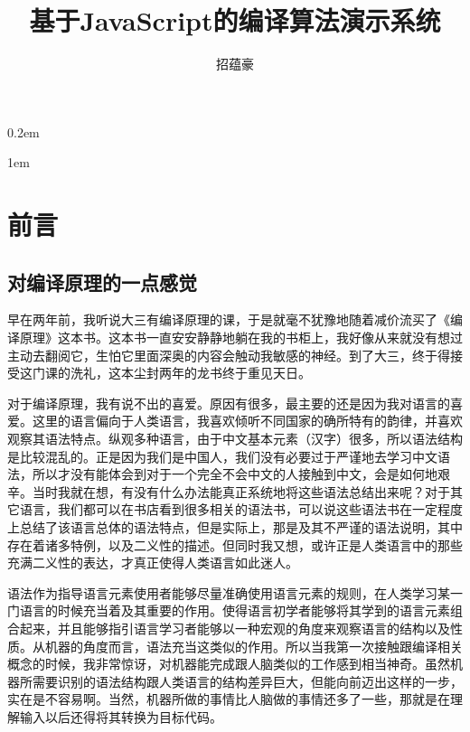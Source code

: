 \documentclass[12pt,leqno]{book}
\begin{document}
\begin{CJK}{UTF8}{gbsn}

\title{\bf{基于JavaScript的编译算法演示系统}}
\author{招蕴豪}
\maketitle
\newpage

\parskip 0.2em
\renewcommand{\contentsname}{目录}
\tableofcontents

\parskip 1em
\chapter*{前言}
\pagestyle{plain}

\section*{对编译原理的一点感觉}
早在两年前，我听说大三有编译原理的课，于是就毫不犹豫地随着减价流买了《编译原理》这本书。这本书一直安安静静地躺在我的书柜上，我好像从来就没有想过主动去翻阅它，生怕它里面深奥的内容会触动我敏感的神经。到了大三，终于得接受这门课的洗礼，这本尘封两年的龙书终于重见天日。

对于编译原理，我有说不出的喜爱。原因有很多，最主要的还是因为我对语言的喜爱。这里的语言偏向于人类语言，我喜欢倾听不同国家的确所特有的韵律，并喜欢观察其语法特点。纵观多种语言，由于中文基本元素（汉字）很多，所以语法结构是比较混乱的。正是因为我们是中国人，我们没有必要过于严谨地去学习中文语法，所以才没有能体会到对于一个完全不会中文的人接触到中文，会是如何地艰辛。当时我就在想，有没有什么办法能真正系统地将这些语法总结出来呢？对于其它语言，我们都可以在书店看到很多相关的语法书，可以说这些语法书在一定程度上总结了该语言总体的语法特点，但是实际上，那是及其不严谨的语法说明，其中存在着诸多特例，以及二义性的描述。但同时我又想，或许正是人类语言中的那些充满二义性的表达，才真正使得人类语言如此迷人。


语法作为指导语言元素使用者能够尽量准确使用语言元素的规则，在人类学习某一门语言的时候充当着及其重要的作用。使得语言初学者能够将其学到的语言元素组合起来，并且能够指引语言学习者能够以一种宏观的角度来观察语言的结构以及性质。从机器的角度而言，语法充当这类似的作用。所以当我第一次接触跟编译相关概念的时候，我非常惊讶，对机器能完成跟人脑类似的工作感到相当神奇。虽然机器所需要识别的语法结构跟人类语言的结构差异巨大，但能向前迈出这样的一步，实在是不容易啊。当然，机器所做的事情比人脑做的事情还多了一些，那就是在理解输入以后还得将其转换为目标代码。


\end{CJK}
\end{document}
